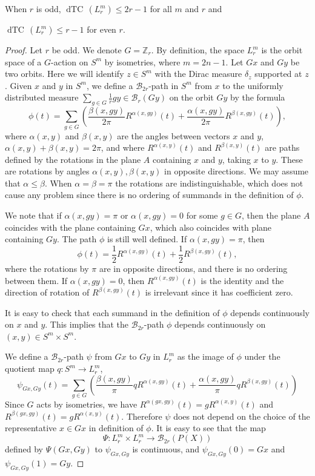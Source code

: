 \documentclass[10pt,a4paper]{amsart}
\def\dTC{{\mathop\mathrm{dTC}\,}}
\begin{document}
\begin{prop}\label{2p-1}
When $r$ is odd,
$\dTC(L^m_r)\le 2r-1$ for all $m$ and  $r$ and

$\dTC(L^m_r)\le r-1$ for even $r$.
\end{prop}

\begin{proof}
Let $r$ be odd.
We denote $G=\mathbb Z_r$.
By definition, the space $L^m_r$ is the orbit space of a $G$-action on $S^m$ by isometries, where $m=2n-1$. 
Let $Gx$ and $Gy$ be two orbits. 
Here we will identify $z\in S^m$ with the Dirac measure $\delta_z$ supported at $z$.
Given $x$ and $y$ in $S^m$, we define a $\mathcal B_{2r}$-path in $S^m$ from $x$ to the uniformly distributed measure $\sum_{g\in G}\frac{1}{r}gy\in\mathcal B_r(Gy)$
on the orbit $Gy$
 by the formula
$$
\phi(t)=\sum_{g\in G}\left(\frac{\beta(x,gy)}{2\pi}R^{\alpha
(x,gy)}(t)+\frac{\alpha(x,gy)}{2\pi}R^{\beta(x,gy)}(t)\right),
$$
where $\alpha(x,y)$ and $\beta(x,y)$ are the angles between vectors $x$ and $y$,
$\alpha(x,y)+\beta(x,y)=2\pi$, and where $R^{\alpha(x,y)}(t)$ and $R^{\beta(x,y)}(t)$ are paths defined by the rotations in the plane $A$ containing  $x$ and $y$, taking $x$ to $y$. These are rotations by angles $\alpha(x,y),\beta(x,y)$ in opposite directions. We may assume that $\alpha\le\beta$.  When $\alpha=\beta=\pi$ the rotations are indistinguishable, which does not cause any problem since there is no ordering of summands in the definition of $\phi$.
 



We note that if $\alpha(x,gy)=\pi$ or $\alpha(x,gy)=0$ for some $g\in G$, then the plane $A$ coincides with the plane containing $Gx$, which also coincides with plane containing $Gy$. The path $\phi$ is still well defined. If $\alpha(x,gy)=\pi$, then $$\phi(t)=\frac{1}{2}R^{\alpha(x,gy)}(t)+\frac{1}{2}R^{\beta(x,gy)}(t),$$ where the rotations by $\pi$ are in opposite directions, and there is no ordering between them. If $\alpha(x,gy)=0$, then $R^{\alpha(x,gy)}(t)$ is the identity and the direction of rotation of $R^{\beta(x,gy)}(t)$
is irrelevant since it has coefficient zero.

It is easy to check that each summand in the definition of $\phi$ depends continuously on $x$ and $y$. This implies that the $\mathcal B_{2r}$-path $\phi$  depends continuously on $(x,y)\in S^m\times S^m$.


We define a $\mathcal B_{2r}$-path $\psi$ from $Gx$ to $Gy$ in $L^m_r$ as the image of $\phi$ under the quotient map $q:S^m\to L^m_r$,
$$
\psi_{Gx,Gy}(t)=\sum_{g\in G}\left(\frac{\beta(x,gy)}{\pi}qR^{\alpha(x,gy)}(t)+\frac{\alpha(x,gy)}{\pi}qR^{\beta(x,gy)}(t)\right)
$$
Since $G$ acts by isometries, we have $R^{\alpha(gx,gy)}(t)=gR^{\alpha(x,y)}(t)$ and
$R^{\beta(gx,gy)}(t)=gR^{\alpha(x,y)}(t)$. Therefore $\psi$ does not depend on the choice of the representative $x\in Gx$ in definition of $\phi$. It is easy to see that the map
$$\Psi:L^m_r\times L^m_r\to\mathcal B_{2r}(P(X))$$ defined by $\Psi(Gx,Gy)$ to $\psi_{Gx,Gy}$ is continuous,
and $\psi_{Gx,Gy}(0)=Gx$ and $ \psi_{Gx,Gy}(1)=Gy$.


\end{proof}
\end{document}
